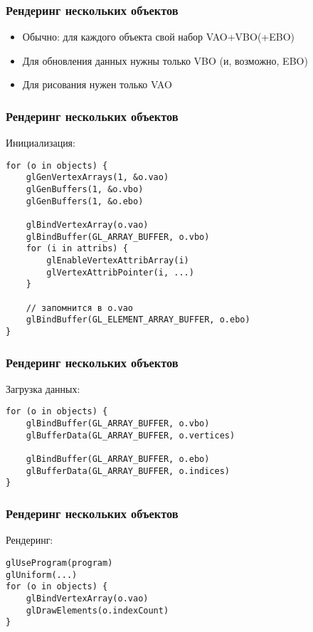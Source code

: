 \documentclass[10pt]{beamer}
\begin{document}
\begin{frame}[fragile]
\frametitle{Рендеринг нескольких объектов}
\begin{itemize}
\item Обычно: для каждого объекта свой набор VAO+VBO(+EBO)
\item Для обновления данных нужны только VBO (и, возможно, EBO)
\item Для рисования нужен только VAO
\end{itemize}
\end{frame}

\begin{frame}[fragile]
\frametitle{Рендеринг нескольких объектов}
Инициализация:
\begin{verbatim}
for (o in objects) {
    glGenVertexArrays(1, &o.vao)
    glGenBuffers(1, &o.vbo)
    glGenBuffers(1, &o.ebo)

    glBindVertexArray(o.vao)
    glBindBuffer(GL_ARRAY_BUFFER, o.vbo)
    for (i in attribs) {
        glEnableVertexAttribArray(i)
        glVertexAttribPointer(i, ...)
    }

    // запомнится в o.vao
    glBindBuffer(GL_ELEMENT_ARRAY_BUFFER, o.ebo)
}
\end{verbatim}
\end{frame}

\begin{frame}[fragile]
\frametitle{Рендеринг нескольких объектов}
Загрузка данных:
\begin{verbatim}
for (o in objects) {
    glBindBuffer(GL_ARRAY_BUFFER, o.vbo)
    glBufferData(GL_ARRAY_BUFFER, o.vertices)

    glBindBuffer(GL_ARRAY_BUFFER, o.ebo)
    glBufferData(GL_ARRAY_BUFFER, o.indices)
}
\end{verbatim}
\end{frame}

\begin{frame}[fragile]
\frametitle{Рендеринг нескольких объектов}
Рендеринг:
\begin{verbatim}
glUseProgram(program)
glUniform(...)
for (o in objects) {
    glBindVertexArray(o.vao)
    glDrawElements(o.indexCount)
}
\end{verbatim}
\end{frame}
\end{document}
